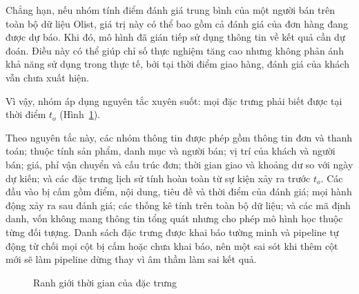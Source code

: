 \documentclass[12pt,a4paper]{report}
\begin{document}
Chẳng hạn, nếu nhóm tính điểm đánh giá trung bình của một người bán trên toàn bộ dữ liệu Olist, giá trị này có thể bao gồm cả đánh giá của đơn hàng đang được dự báo. Khi đó, mô hình đã gián tiếp sử dụng thông tin về kết quả cần dự đoán. Điều này có thể giúp chỉ số thực nghiệm tăng cao nhưng không phản ánh khả năng sử dụng trong thực tế, bởi tại thời điểm giao hàng, đánh giá của khách vẫn chưa xuất hiện.

Vì vậy, nhóm áp dụng nguyên tắc xuyên suốt: mọi đặc trưng phải biết được tại thời điểm $t_o$ (Hình~\ref{fig:leakage-timeline}).

Theo nguyên tắc này, các nhóm thông tin được phép gồm thông tin đơn và thanh toán; thuộc tính sản phẩm, danh mục và người bán; vị trí của khách và người bán; giá, phí vận chuyển và cấu trúc đơn; thời gian giao và khoảng dư so với ngày dự kiến; và các đặc trưng lịch sử tính hoàn toàn từ sự kiện xảy ra trước $t_o$. Các đầu vào bị cấm gồm điểm, nội dung, tiêu đề và thời điểm của đánh giá; mọi hành động xảy ra sau đánh giá; các thống kê tính trên toàn bộ dữ liệu; và các mã định danh, vốn không mang thông tin tổng quát nhưng cho phép mô hình học thuộc từng đối tượng. Danh sách đặc trưng được khai báo tường minh và pipeline tự động từ chối mọi cột bị cấm hoặc chưa khai báo, nên một sai sót khi thêm cột mới sẽ làm pipeline dừng thay vì âm thầm làm sai kết quả.

\begin{figure}[htbp]\centering
{}
\caption{Ranh giới thời gian của đặc trưng}
\label{fig:leakage-timeline}
\end{figure}
\end{document}
